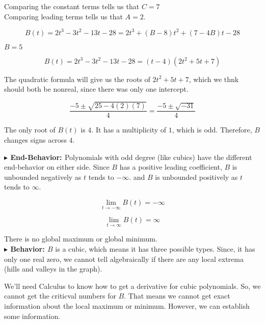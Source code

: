 \documentclass{ximera}
\begin{document}
\begin{exercise}
Comparing the constant terms tells us that $C = 7$ \\



Comparing leading terms tells us that $A = 2$.



\[
B(t) = 2 t^3 - 3 t^2 - 13 t - 28 = 2 t^3 + (B - 8) t^2 + (7 - 4 B) t - 28 
\]


$B = 5$



\[
B(t) = 2 t^3 - 3 t^2 - 13 t - 28 = (t-4)(2 t^2 + 5 t + 7)
\]




The quadratic formula will give us the roots of $2 t^2 + 5 t + 7$, which we thnk should both be nonreal, since there was only one intercept.


\[
\frac{-5 \pm \sqrt{25-4 (2) (7)}}{4} = \frac{-5 \pm \sqrt{-31}}{4}
\]







The only root of $B(t)$ is $4$.  It has a multiplicity of $1$, which is odd.  Therefore, $B$ changes signs across $4$.










\textbf{\textcolor{blue!55!black}{$\blacktriangleright$ End-Behavior: }} Polynomials with odd degree (like cubics) have the different end-behavior on either side.  Since $B$ has a positive leading coefficient, $B$ is unbounded negatively as $t$ tends to $-\infty$. and $B$ is unbounded positively as $t$ tends to $\infty$.

\[
\lim\limits_{t \to -\infty} B(t) = -\infty
\]


\[
\lim\limits_{t \to \infty} B(t) = \infty
\]


There is no global maximum or global minimum. \\



\textbf{\textcolor{blue!55!black}{$\blacktriangleright$ Behavior: }}  $B$ is a cubic, which means it has three possible types. Since, it has only one real zero, we cannot tell algebraically if there are any local extrema (hills and valleys in the graph).




We'll need Calculus to know how to get a derivative for cubic polynomials.  So, we cannot get the criticval numbers for $B$.  That means we cannot get exact information about the local maximum or minimum.  However, we can establish some information.








\end{exercise}
\end{document}
